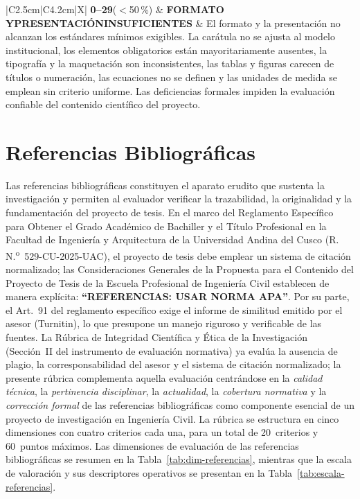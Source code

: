 \begin{table}[htbp]
\begin{tabularx}{\textwidth}{|C{2.5cm}|C{4.2cm}|X|}
\textbf{0--29}\newline($<$50\,\%) &
\textcolor{cins}{\textbf{FORMATO Y\newline PRESENTACIÓN\newline INSUFICIENTES}} &
El formato y la presentación no alcanzan los estándares mínimos exigibles. La carátula no se ajusta al modelo institucional, los elementos obligatorios están mayoritariamente ausentes, la tipografía y la maquetación son inconsistentes, las tablas y figuras carecen de títulos o numeración, las ecuaciones no se definen y las unidades de medida se emplean sin criterio uniforme. Las deficiencias formales impiden la evaluación confiable del contenido científico del proyecto. \\ \hline
\end{tabularx}
\normalsize
\end{table}

\clearpage
\section{Referencias Bibliográficas}

{\footnotesize
Las referencias bibliográficas constituyen el aparato erudito que sustenta la investigación y permiten al evaluador verificar la trazabilidad, la originalidad y la fundamentación del proyecto de tesis. En el marco del Reglamento Específico para Obtener el Grado Académico de Bachiller y el Título Profesional en la Facultad de Ingeniería y Arquitectura de la Universidad Andina del Cusco (R.\,N.\textsuperscript{o}~529-CU-2025-UAC), el proyecto de tesis debe emplear un sistema de citación normalizado; las Consideraciones Generales de la Propuesta para el Contenido del Proyecto de Tesis de la Escuela Profesional de Ingeniería Civil establecen de manera explícita: \textbf{``REFERENCIAS: USAR NORMA APA''}. Por su parte, el Art.~91 del reglamento específico exige el informe de similitud emitido por el asesor (Turnitin), lo que presupone un manejo riguroso y verificable de las fuentes. La Rúbrica de Integridad Científica y Ética de la Investigación (Sección~II del instrumento de evaluación normativa) ya evalúa la ausencia de plagio, la corresponsabilidad del asesor y el sistema de citación normalizado; la presente rúbrica complementa aquella evaluación centrándose en la \textit{calidad técnica}, la \textit{pertinencia disciplinar}, la \textit{actualidad}, la \textit{cobertura normativa} y la \textit{corrección formal} de las referencias bibliográficas como componente esencial de un proyecto de investigación en Ingeniería Civil. La rúbrica se estructura en cinco dimensiones con cuatro criterios cada una, para un total de 20~criterios y 60~puntos máximos. Las dimensiones de evaluación de las referencias bibliográficas se resumen en la Tabla~\ref{tab:dim-referencias}, mientras que la escala de valoración y sus descriptores operativos se presentan en la Tabla~\ref{tab:escala-referencias}.\par
}

